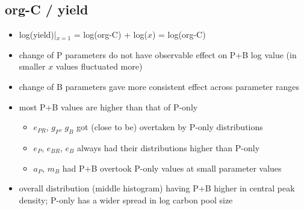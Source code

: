 \documentclass[../thesis.tex]{subfiles} %
\begin{document}
\subsection{org-C / yield}
\begin{itemize}
    \item log(yield)|$_{x=1}$ = log(org-C) + log($x$) = log(org-C)
    \item change of P parameters do not have observable effect on P+B log value (in smaller $x$ values fluctuated more)
    \item change of B parameters gave more consistent effect across parameter ranges
    \item most P+B values are higher than that of P-only
    \begin{itemize}
        \item $e_{PR}$, $g_P$, $g_B$ got (close to be) overtaken by P-only distributions
        \item $e_P$, $e_{BR}$, $e_B$ always had their distributions higher than P-only
        \item $a_P$, $m_B$ had P+B overtook P-only values at small parameter values
    \end{itemize}
    \item overall distribution (middle histogram) having P+B higher in central peak density; P-only has a wider spread in log carbon pool size
\end{itemize}
\end{document}

